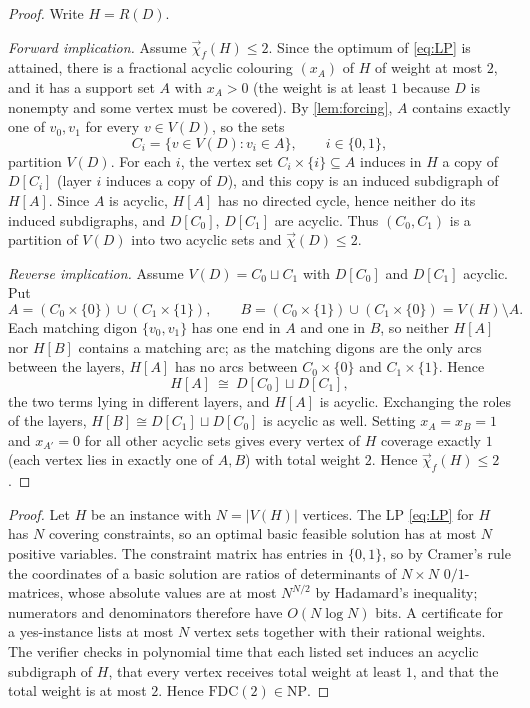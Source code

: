 \documentclass[11pt,a4paper]{article}
\theoremstyle{plain}
\theoremstyle{definition}
\theoremstyle{remark}
\newcommand{\fdc}{\vec{\chi}_{f}}
\newcommand{\dic}{\vec{\chi}}
\newcommand{\FDC}{\mathrm{FDC}}
\newcommand{\NP}{\mathrm{NP}}
\begin{document}
\label{pf:equiv}
\propequiv*
\begin{proof}
Write $H=R(D)$.

\emph{Forward implication.} Assume $\fdc(H)\le2$. Since the optimum of \eqref{eq:LP} is attained, there is a fractional acyclic colouring $(x_A)$ of $H$ of weight at most $2$, and it has a support set $A$ with $x_A>0$ (the weight is at least $1$ because $D$ is nonempty and some vertex must be covered). By \cref{lem:forcing}, $A$ contains exactly one of $v_0,v_1$ for every $v\in V(D)$, so the sets
\[
 C_i=\{v\in V(D): v_i\in A\},\qquad i\in\{0,1\},
\]
partition $V(D)$. For each $i$, the vertex set $C_i\times\{i\}\subseteq A$ induces in $H$ a copy of $D[C_i]$ (layer $i$ induces a copy of $D$), and this copy is an induced subdigraph of $H[A]$. Since $A$ is acyclic, $H[A]$ has no directed cycle, hence neither do its induced subdigraphs, and $D[C_0]$, $D[C_1]$ are acyclic. Thus $(C_0,C_1)$ is a partition of $V(D)$ into two acyclic sets and $\dic(D)\le2$.

\emph{Reverse implication.} Assume $V(D)=C_0\sqcup C_1$ with $D[C_0]$ and $D[C_1]$ acyclic. Put
\[
 A=(C_0\times\{0\})\cup(C_1\times\{1\}),\qquad B=(C_0\times\{1\})\cup(C_1\times\{0\})=V(H)\setminus A .
\]
Each matching digon $\{v_0,v_1\}$ has one end in $A$ and one in $B$, so neither $H[A]$ nor $H[B]$ contains a matching arc; as the matching digons are the only arcs between the layers, $H[A]$ has no arcs between $C_0\times\{0\}$ and $C_1\times\{1\}$. Hence
\[
 H[A]\ \cong\ D[C_0]\sqcup D[C_1],
\]
the two terms lying in different layers, and $H[A]$ is acyclic. Exchanging the roles of the layers, $H[B]\cong D[C_1]\sqcup D[C_0]$ is acyclic as well. Setting $x_A=x_B=1$ and $x_{A'}=0$ for all other acyclic sets gives every vertex of $H$ coverage exactly $1$ (each vertex lies in exactly one of $A,B$) with total weight $2$. Hence $\fdc(H)\le2$.
\end{proof}

\label{pf:np}
\lemnp*
\begin{proof}
Let $H$ be an instance with $N=|V(H)|$ vertices. The LP \eqref{eq:LP} for $H$ has $N$ covering constraints, so an optimal basic feasible solution has at most $N$ positive variables. The constraint matrix has entries in $\{0,1\}$, so by Cramer's rule the coordinates of a basic solution are ratios of determinants of $N\times N$ $0/1$-matrices, whose absolute values are at most $N^{N/2}$ by Hadamard's inequality; numerators and denominators therefore have $O(N\log N)$ bits. A certificate for a yes-instance lists at most $N$ vertex sets together with their rational weights. The verifier checks in polynomial time that each listed set induces an acyclic subdigraph of $H$, that every vertex receives total weight at least $1$, and that the total weight is at most $2$. Hence $\FDC(2)\in\NP$.
\end{proof}
\end{document}
